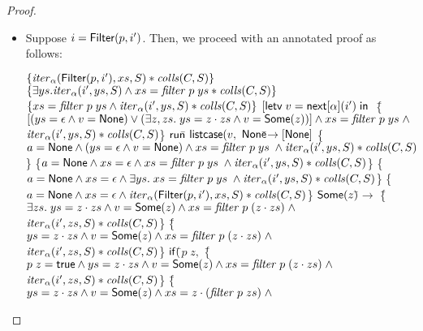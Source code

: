 \begin{proof}
\begin{itemize}
\item Suppose $i = \mathsf{Filter}(p, i')$. Then, we proceed with an annotated proof as 
follows: 
\begin{specification}
\nextline $\{{\mathit{iter}_\alpha(\mathsf{Filter}(p, i'), xs, S) * \mathit{colls}(C,S)}\}$ 
\nextline $\{{\exists ys. \mathit{iter}_\alpha(i', ys, S) \land 
                              xs = \mathit{filter}\;p\;ys * 
                              \mathit{colls}(C,S)}\}$   
\nextline $\{{xs = \mathit{filter}\;p\;ys \land
                  \mathit{iter}_\alpha(i', ys, S) *
                  \mathit{colls}(C,S)}\}$
\nextline $[\mathsf{letv}\;v = \mathsf{next}[\alpha](i')\;\mathsf{in}\;$ 
\nextline \{\=$[(ys = \epsilon \land v = \mathsf{None}) \vee 
                (\exists z, zs.\; ys = z\cdot zs \land v = \mathsf{Some}(z))] \land
               xs = \mathit{filter}\;p\;ys \;\land$ 
\contline $\mathit{iter}_\alpha(i', ys, S) * \mathit{colls}(C,S)$\}
\nextline \;$\mathsf{run}$\=$\;\mathsf{listcase}(v,$ 
\nextline \> $\mathsf{None}$\=$ \to [\mathsf{None}]$ 
\nextline \> \{$a = \mathsf{None} \land 
               (ys = \epsilon \land v = \mathsf{None}) \land 
                xs = \mathit{filter}\;p\;ys \;\land
                \mathit{iter}_\alpha(i', ys, S) * \mathit{colls}(C,S)$\}
\nextline \> \{$a = \mathsf{None} \land xs = \epsilon \land
                xs = \mathit{filter}\;p\;ys \;\land
                \mathit{iter}_\alpha(i', ys, S) * \mathit{colls}(C,S)$\}
\nextline \> \{$a = \mathsf{None} \land xs = \epsilon \land
                \exists ys.\;
                xs = \mathit{filter}\;p\;ys \;\land
                \mathit{iter}_\alpha(i', ys, S) * \mathit{colls}(C,S)$\}
\nextline \> \{$a = \mathsf{None} \land xs = \epsilon \land
                \mathit{iter}_\alpha(\mathsf{Filter}(p, i'), xs, S) * \mathit{colls}(C,S)$\}
\nextline \> $\mathsf{Some}(z)$\=$\to$
\nextline \> \;\;\{\=$\exists zs.\; ys = z\cdot zs \land v = \mathsf{Some}(z) \land
                  xs = \mathit{filter}\;p\;(z\cdot zs) \;\land$ 
\\ \> \> \>      $\mathit{iter}_\alpha(i', zs, S) * \mathit{colls}(C,S)$\}
\nextline \> \;\;\{\=$ys = z\cdot zs \land v = \mathsf{Some}(z) \land
                   xs = \mathit{filter}\;p\;(z\cdot zs) \;\land$ 
\\ \> \> \>      $\mathit{iter}_\alpha(i', zs, S) * \mathit{colls}(C,S)$\}
\nextline \> \;\;$\mathsf{if}($\=$p\;z,$ 
\nextline \> \> \{\=$p\;z = \mathsf{true} \land ys = z\cdot zs \land v =\mathsf{Some}(z) \land
                   xs = \mathit{filter}\;p\;(z\cdot zs) \;\land$ 
\\ \> \> \>      $\mathit{iter}_\alpha(i', zs, S) * \mathit{colls}(C,S)$\}
\nextline \> \> \{\=$ys = z\cdot zs \land v =\mathsf{Some}(z) \land
                   xs = z\cdot(\mathit{filter}\;p\;zs) \;\land$ 

\end{specification}
\end{itemize}
\end{proof}
